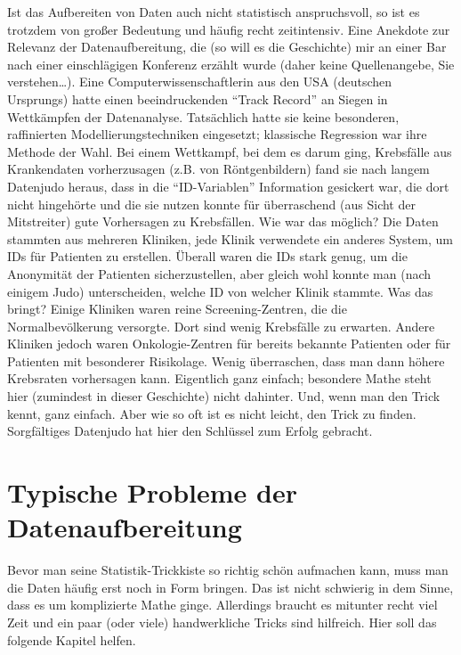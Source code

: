\documentclass[12pt,ngerman,]{book}
\theoremstyle{definition}
\theoremstyle{definition}
\theoremstyle{remark}
\begin{document}
Ist das Aufbereiten von Daten auch nicht statistisch anspruchsvoll, so
ist es trotzdem von großer Bedeutung und häufig recht zeitintensiv. Eine
Anekdote zur Relevanz der Datenaufbereitung, die (so will es die
Geschichte) mir an einer Bar nach einer einschlägigen Konferenz erzählt
wurde (daher keine Quellenangebe, Sie verstehen\ldots{}). Eine
Computerwissenschaftlerin aus den USA (deutschen Ursprungs) hatte einen
beeindruckenden ``Track Record'' an Siegen in Wettkämpfen der
Datenanalyse. Tatsächlich hatte sie keine besonderen, raffinierten
Modellierungstechniken eingesetzt; klassische Regression war ihre
Methode der Wahl. Bei einem Wettkampf, bei dem es darum ging, Krebsfälle
aus Krankendaten vorherzusagen (z.B. von Röntgenbildern) fand sie nach
langem Datenjudo heraus, dass in die ``ID-Variablen'' Information
gesickert war, die dort nicht hingehörte und die sie nutzen konnte für
überraschend (aus Sicht der Mitstreiter) gute Vorhersagen zu
Krebsfällen. Wie war das möglich? Die Daten stammten aus mehreren
Kliniken, jede Klinik verwendete ein anderes System, um IDs für
Patienten zu erstellen. Überall waren die IDs stark genug, um die
Anonymität der Patienten sicherzustellen, aber gleich wohl konnte man
(nach einigem Judo) unterscheiden, welche ID von welcher Klinik stammte.
Was das bringt? Einige Kliniken waren reine Screening-Zentren, die die
Normalbevölkerung versorgte. Dort sind wenig Krebsfälle zu erwarten.
Andere Kliniken jedoch waren Onkologie-Zentren für bereits bekannte
Patienten oder für Patienten mit besonderer Risikolage. Wenig
überraschen, dass man dann höhere Krebsraten vorhersagen kann.
Eigentlich ganz einfach; besondere Mathe steht hier (zumindest in dieser
Geschichte) nicht dahinter. Und, wenn man den Trick kennt, ganz einfach.
Aber wie so oft ist es nicht leicht, den Trick zu finden. Sorgfältiges
Datenjudo hat hier den Schlüssel zum Erfolg gebracht.

\section{Typische Probleme der
Datenaufbereitung}\label{typische-probleme-der-datenaufbereitung}

Bevor man seine Statistik-Trickkiste so richtig schön aufmachen kann,
muss man die Daten häufig erst noch in Form bringen. Das ist nicht
schwierig in dem Sinne, dass es um komplizierte Mathe ginge. Allerdings
braucht es mitunter recht viel Zeit und ein paar (oder viele)
handwerkliche Tricks sind hilfreich. Hier soll das folgende Kapitel
helfen.
\end{document}
